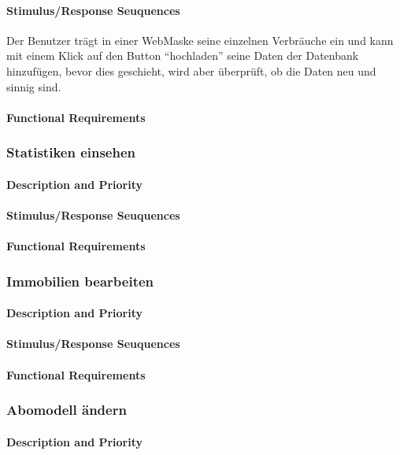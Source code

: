 \paragraph{Stimulus/Response Seuquences}
Der Benutzer trägt in einer WebMaske seine einzelnen Verbräuche ein und kann mit einem Klick auf den Button “hochladen” seine Daten der Datenbank hinzufügen, bevor dies geschieht, wird aber überprüft, ob die Daten neu und sinnig sind.
\paragraph{Functional Requirements}

\subsubsection{Statistiken einsehen}
\paragraph{Description and Priority}
\paragraph{Stimulus/Response Seuquences}
\paragraph{Functional Requirements}

\subsubsection{Immobilien bearbeiten}
\paragraph{Description and Priority}
\paragraph{Stimulus/Response Seuquences}
\paragraph{Functional Requirements}

\subsubsection{Abomodell ändern}
\paragraph{Description and Priority}
